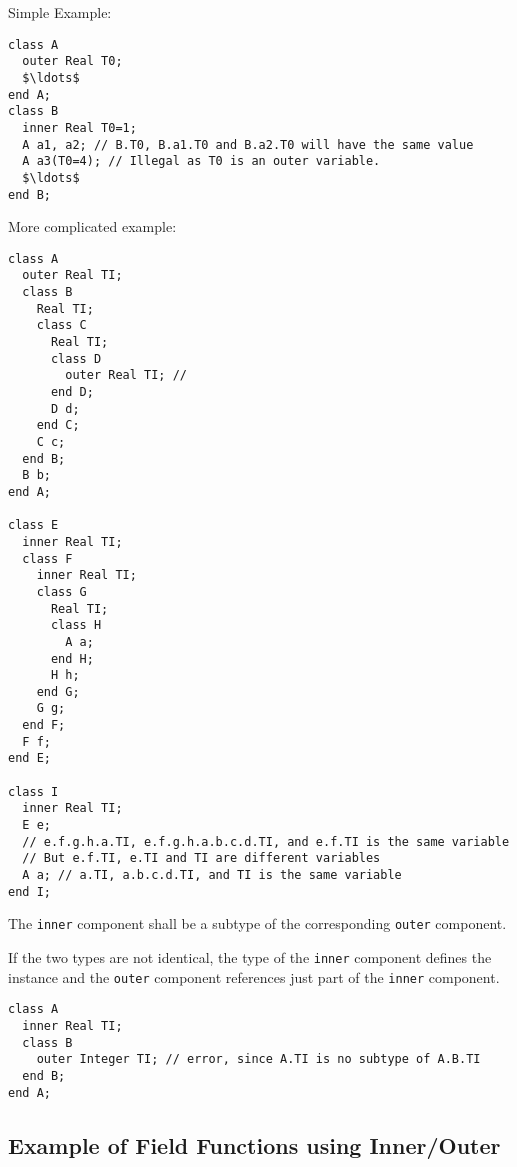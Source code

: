 \begin{example}
Simple Example:
\begin{lstlisting}[language=modelica]
class A
  outer Real T0;
  $\ldots$
end A;
class B
  inner Real T0=1;
  A a1, a2; // B.T0, B.a1.T0 and B.a2.T0 will have the same value
  A a3(T0=4); // Illegal as T0 is an outer variable.
  $\ldots$
end B;
\end{lstlisting}
More complicated example:
\begin{lstlisting}[language=modelica]
class A
  outer Real TI;
  class B
    Real TI;
    class C
      Real TI;
      class D
        outer Real TI; //
      end D;
      D d;
    end C;
    C c;
  end B;
  B b;
end A;

class E
  inner Real TI;
  class F
    inner Real TI;
    class G
      Real TI;
      class H
        A a;
      end H;
      H h;
    end G;
    G g;
  end F;
  F f;
end E;

class I
  inner Real TI;
  E e;
  // e.f.g.h.a.TI, e.f.g.h.a.b.c.d.TI, and e.f.TI is the same variable
  // But e.f.TI, e.TI and TI are different variables
  A a; // a.TI, a.b.c.d.TI, and TI is the same variable
end I;
\end{lstlisting}
\end{example}

The \lstinline!inner! component shall be a subtype of the corresponding \lstinline!outer! component.

\begin{nonnormative}
If the two types are not identical, the type of the \lstinline!inner! component defines the instance and the \lstinline!outer! component references just part of the
\lstinline!inner! component.
\end{nonnormative}

\begin{example}
\begin{lstlisting}[language=modelica]
class A
  inner Real TI;
  class B
    outer Integer TI; // error, since A.TI is no subtype of A.B.TI
  end B;
end A;
\end{lstlisting}
\end{example}

\subsection{Example of Field Functions using Inner/Outer}\label{example-of-field-functions-using-inner-outer}

